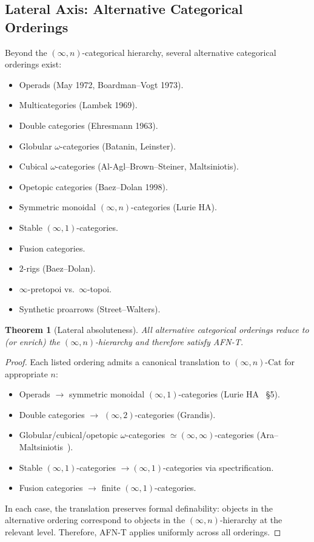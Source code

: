 \documentclass[11pt]{article}
\theoremstyle{plain}
\newtheorem{theorem}{Theorem}[section]
\theoremstyle{definition}
\newcommand{\Cat}{\mathrm{Cat}}
\begin{document}
\subsection{Lateral Axis: Alternative Categorical Orderings}

Beyond the $(\infty, n)$-categorical hierarchy, several alternative categorical orderings exist:
\begin{itemize}
\item Operads (May 1972, Boardman--Vogt 1973).
\item Multicategories (Lambek 1969).
\item Double categories (Ehresmann 1963).
\item Globular $\omega$-categories (Batanin, Leinster).
\item Cubical $\omega$-categories (Al-Agl--Brown--Steiner, Maltsiniotis).
\item Opetopic categories (Baez--Dolan 1998).
\item Symmetric monoidal $(\infty, n)$-categories (Lurie HA).
\item Stable $(\infty, 1)$-categories.
\item Fusion categories.
\item $2$-rigs (Baez--Dolan).
\item $\infty$-pretopoi vs.\ $\infty$-topoi.
\item Synthetic proarrows (Street--Walters).
\end{itemize}

\begin{theorem}[Lateral absoluteness]\label{thm:lateral}
All alternative categorical orderings reduce to (or enrich) the $(\infty, n)$-hierarchy and therefore satisfy AFN-T.
\end{theorem}

\begin{proof}
Each listed ordering admits a canonical translation to $(\infty, n)$-$\Cat$ for appropriate $n$:
\begin{itemize}
\item Operads $\to$ symmetric monoidal $(\infty, 1)$-categories (Lurie HA~\cite{LurieHA} \S 5).
\item Double categories $\to$ $(\infty, 2)$-categories (Grandis).
\item Globular/cubical/opetopic $\omega$-categories $\simeq (\infty, \infty)$-categories (Ara--Maltsiniotis~\cite{AraMaltsiniotis2017}).
\item Stable $(\infty, 1)$-categories $\to (\infty, 1)$-categories via spectrification.
\item Fusion categories $\to$ finite $(\infty, 1)$-categories.
\end{itemize}
In each case, the translation preserves formal definability: objects in the alternative ordering correspond to objects in the $(\infty, n)$-hierarchy at the relevant level. Therefore, AFN-T applies uniformly across all orderings.
\end{proof}
\end{document}
